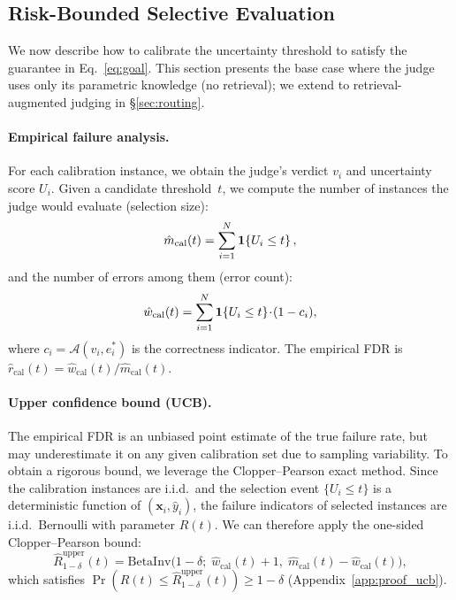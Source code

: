 \subsection{Risk-Bounded Selective Evaluation}
\label{sec:single}

We now describe how to calibrate the uncertainty threshold to satisfy the guarantee in Eq.~\eqref{eq:goal}. This section presents the base case where the judge uses only its parametric knowledge (no retrieval); we extend to retrieval-augmented judging in \S\ref{sec:routing}.

\paragraph{Empirical failure analysis.}
For each calibration instance, we obtain the judge's verdict $v_i$ and uncertainty score $U_i$. Given a candidate threshold~$t$, we compute the number of instances the judge would evaluate (selection size):
\begin{equation}
\label{eq:mcal}
  \hat{m}_{\mathrm{cal}}(t) = \sum_{i=1}^{N} \mathbf{1}\!\left\{U_i \leq t\right\},
\end{equation}
and the number of errors among them (error count):
\begin{equation}
\label{eq:wcal}
  \hat{w}_{\mathrm{cal}}(t) = \sum_{i=1}^{N} \mathbf{1}\!\left\{U_i \leq t\right\}\!\cdot\!(1 - c_i),
\end{equation}
where $c_i = \mathcal{A}(v_i, e^*_i)$ is the correctness indicator. The empirical FDR is $\hat{r}_{\mathrm{cal}}(t) = \hat{w}_{\mathrm{cal}}(t) / \hat{m}_{\mathrm{cal}}(t)$.

\paragraph{Upper confidence bound (UCB).}
The empirical FDR is an unbiased point estimate of the true failure rate, but may underestimate it on any given calibration set due to sampling variability. To obtain a rigorous bound, we leverage the Clopper--Pearson exact method. Since the calibration instances are i.i.d.\ and the selection event $\{U_i \leq t\}$ is a deterministic function of $(\mathbf{x}_i, \hat{y}_i)$, the failure indicators of selected instances are i.i.d.\ Bernoulli with parameter $R(t)$. We can therefore apply the one-sided Clopper--Pearson bound:
\begin{equation}
\label{eq:ucb}
  \hat{R}^{\mathrm{upper}}_{1-\delta}(t) =
  \mathrm{BetaInv}\!\big(
  1 - \delta;\;
  \hat{w}_{\mathrm{cal}}(t) + 1,\;
  \hat{m}_{\mathrm{cal}}(t) - \hat{w}_{\mathrm{cal}}(t)
  \big),
\end{equation}
which satisfies $\Pr(R(t) \leq \hat{R}^{\mathrm{upper}}_{1-\delta}(t)) \geq 1 - \delta$ (Appendix~\ref{app:proof_ucb}).

